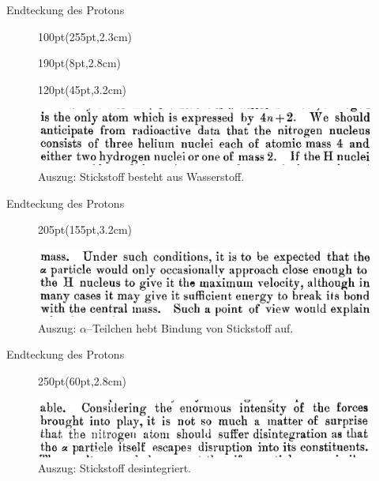 \documentclass[t,9pt]{beamer}
\newcommand{\highlight}[3]{ \begin{textblock*}{#1}(#2,#3) \begin{tcolorbox} [enhanced,opacityfill=.1,colback=blue] \end{tcolorbox} \end{textblock*} } %
\begin{document}
        \begin{frame}{Endteckung des Protons}
                \begin{figure}
                        \highlight{100pt}{255pt}{2.3cm}
                        \highlight{190pt}{8pt}{2.8cm}
                        \highlight{120pt}{45pt}{3.2cm}
                        \includegraphics[width=\textwidth]{prosi_nitrogen_made_of_H.png}
                        \caption{Auszug: Stickstoff besteht aus Wasserstoff.\cite{Rutherford1919}}
                \end{figure}
        \end{frame}

        \begin{frame}{Endteckung des Protons}
                \begin{figure}
                        \highlight{205pt}{155pt}{3.2cm}
                        \includegraphics[width=\textwidth]{prosi_alpha_breaks_H_from_nitrogen.png}
                        \caption{Auszug: $\alpha $--Teilchen hebt Bindung von Stickstoff auf.\cite{Rutherford1919}}
                \end{figure}
        \end{frame}

        \begin{frame}{Endteckung des Protons}
                \begin{figure}
                        \highlight{250pt}{60pt}{2.8cm}
                        \includegraphics[width=\textwidth]{prosi_nitrogen_disintegrates.png}
                        \caption{Auszug: Stickstoff desintegriert.\cite{Rutherford1919}}
                \end{figure}
        \end{frame}
\end{document}
